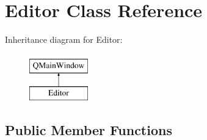 \hypertarget{class_editor}{}\section{Editor Class Reference}
\label{class_editor}
Inheritance diagram for Editor\+:\begin{figure}[H]
\begin{center}
\leavevmode
\includegraphics[height=2.000000cm]{class_editor}
\end{center}
\end{figure}
\subsection*{Public Member Functions}
